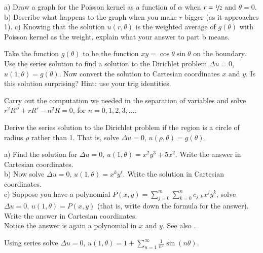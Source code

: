 \begin{exercise}
a) Draw a graph for the Poisson kernel as a function of $\alpha$
when $r=\nicefrac{1}{2}$ and $\theta = 0$.
b) Describe what happens to the graph when you make $r$ bigger (as it
approaches 1).
c) Knowing that the solution $u(r,\theta)$ is the weighted average
of $g(\theta)$ with Poisson kernel as the weight, explain what your answer
to part b means.
\end{exercise}

\begin{exercise} \label{exercise:dirichproblemxy}
Take the function $g(\theta)$ to be the function $xy = \cos \theta \sin
\theta$ on the boundary.  Use the series solution to find a solution
to the Dirichlet problem $\Delta u = 0$, $u(1,\theta) = g(\theta)$.  Now
convert the solution to Cartesian coordinates $x$ and $y$.  Is this
solution surprising?  Hint: use your trig identities.
\end{exercise}

\begin{exercise}
Carry out the computation we needed in the separation of variables and solve
$r^2 R'' + r R' - n^2 R = 0$, for $n=0,1,2,3,\ldots$.
\end{exercise}

\begin{exercise}[challenging]
Derive the series solution to the Dirichlet problem if the region is a
circle of radius $\rho$ rather
than 1.
That is, solve $\Delta u = 0$, $u(\rho,\theta) = g(\theta)$.
\end{exercise}

\begin{exercise}[challenging]
a) Find the solution for
$\Delta u = 0$, $u(1,\theta) = x^2y^3 + 5 x^2$.  Write the answer in Cartesian coordinates.
\\
b) Now solve
$\Delta u = 0$, $u(1,\theta) = x^k y^\ell$.
Write the solution in Cartesian coordinates.
\\
c) Suppose you have a polynomial $P(x,y) = \sum_{j=0}^m \sum_{k=0}^n c_{j,k}
x^j y^k$, solve $\Delta u = 0$, $u(1,\theta) = P(x,y)$ (that is, write down
the formula for the answer).  Write the answer
in Cartesian coordinates.\\
Notice the answer is again a polynomial in $x$ and $y$.
See also .
\end{exercise}

\setcounter{exercise}{100}

\begin{exercise}
Using series solve
$\Delta u = 0$, $u(1,\theta) = 1+ \sum\limits_{n=1}^\infty \frac{1}{n^2}\sin(n\theta)$.
\end{exercise}

